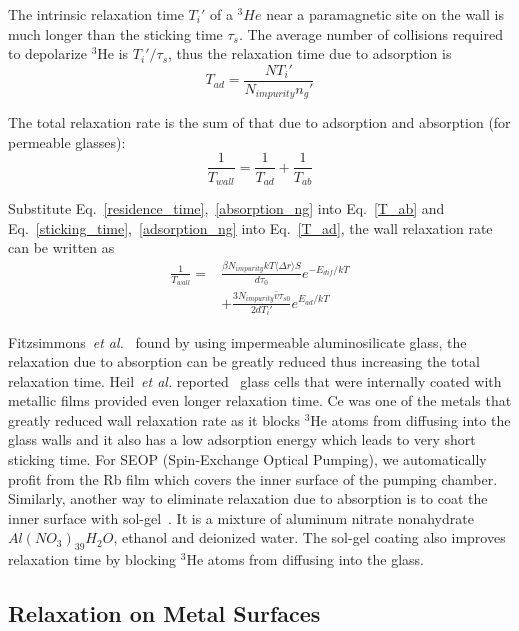 The intrinsic relaxation time $T_i'$ of a $^{3}He$ near a paramagnetic site on the wall is much longer than the sticking time $\tau_s$. The average number of collisions required to depolarize $^{3}$He is $T_i'/\tau_s$, thus the relaxation time due to adsorption is
\begin{equation}\label{T_ad}
T_{ad}=\frac{NT_i'}{N_{impurity}n_g'}
\end{equation}

The total relaxation rate is the sum of that due to adsorption and absorption (for permeable glasses):
\begin{equation}
\frac{1}{T_{wall}}=\frac{1}{T_{ad}}+\frac{1}{T_{ab}}
\end{equation}

Substitute Eq.~\ref{residence_time},~\ref{absorption_ng} into Eq.~\ref{T_ab} and Eq.~\ref{sticking_time},~\ref{adsorption_ng} into Eq.~\ref{T_ad}, the wall relaxation rate can be written as
\begin{equation}
\begin{split}
\frac{1}{T_{wall}}=&\frac{\beta N_{impurity}kT\langle\Delta r\rangle S}{d\tau_0}e^{-E_{dif}/kT}\\
&+\frac{3N_{impurity}\bar{v}\tau_{s0}}{2dT_i'}e^{E_{ad}/kT}
\end{split}
\end{equation}

Fitzsimmons~\emph{et al.}~\cite{PhysRev.179.156} found by using impermeable aluminosilicate glass, the relaxation due to absorption can be greatly reduced thus increasing the total relaxation time. Heil~\emph{et al.} reported~\cite{PhysRevA.201.337} glass cells that were internally coated with metallic films provided even longer relaxation time. Ce was one of the metals that greatly reduced wall relaxation rate as it blocks $^{3}$He atoms from diffusing into the glass walls and it also has a low adsorption energy which leads to very short sticking time. For SEOP (Spin-Exchange Optical Pumping), we automatically profit from the Rb film which covers the inner surface of the pumping chamber. Similarly, another way to eliminate relaxation due to absorption is to coat the inner surface with sol-gel~\cite{solgel}. It is a mixture of aluminum nitrate nonahydrate $Al(NO_3)_39H_2O$, ethanol and deionized water. The sol-gel coating also improves relaxation time by blocking $^{3}$He atoms from diffusing into the glass.

\subsection{Relaxation on Metal Surfaces}